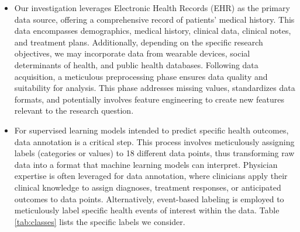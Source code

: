 \documentclass[conference]{IEEEtran}
\begin{document}
    \begin{itemize}
        \item Our investigation leverages Electronic Health Records (EHR) as the primary data source, offering a comprehensive record of patients' medical history. This data encompasses demographics, medical history, clinical data, clinical notes, and treatment plans. Additionally, depending on the specific research objectives, we may incorporate data from wearable devices, social determinants of health, and public health databases. Following data acquisition, a meticulous preprocessing phase ensures data quality and suitability for analysis. This phase addresses missing values, standardizes data formats, and potentially involves feature engineering to create new features relevant to the research question.
    
        \item For supervised learning models intended to predict specific health outcomes, data annotation is a critical step. This process involves meticulously assigning labels (categories or values) to 18 different data points, thus transforming raw data into a format that machine learning models can interpret. Physician expertise is often leveraged for data annotation, where clinicians apply their clinical knowledge to assign diagnoses, treatment responses, or anticipated outcomes to data points. Alternatively, event-based labeling is employed to meticulously label specific health events of interest within the data. Table \ref{tab:classes} lists the specific labels we consider.
    

\end{itemize}
\end{document}

